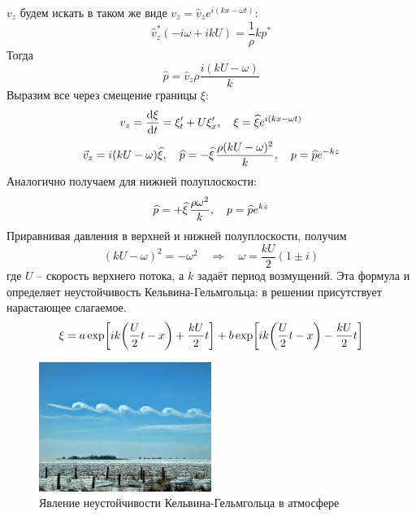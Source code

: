 $v_z$ будем искать в таком же виде $v_z=\hat{v}_z e^{i(kx-\omega t)}$:
\begin{equation}
    \hat{v}_z^* (-i\omega +ikU) = \frac{1}{\rho}k p^*
\end{equation} 
Тогда
\begin{equation}
    \hat{p} = \hat{v}_z \rho \frac{i(kU-\omega)}{k}
\end{equation}
Выразим все через смещение границы $\xi$:
\begin{equation}
    v_z = \dv{\xi}{t} = \xi'_t + U \xi'_x, \quad
    \xi = \widehat{\xi} e^{i(kx-\omega t)}
\end{equation}
\begin{equation}
    \vec{v}_z = i(kU-\omega)\hat{\xi}, \quad
    \hat{p} = -\phat{\xi} \frac{\rho(kU-\omega)^2}{k}, \quad
        p = \hat{p} e^{-kz}
\end{equation}
Аналогично получаем для нижней полуплоскости:
\begin{equation}
   \hat{p} = +\phat{\xi} \frac{\rho \omega^2}{k}, \quad
   p = \hat{p} e^{kz} 
\end{equation}
Приравнивая давления в верхней и нижней полуплоскости, получим
\begin{equation}
    (kU-\omega)^2 = -\omega^2 
    \quad\Rightarrow\quad 
    \omega = \frac{kU}{2}(1\pm i)
\end{equation}
где $U$ -- скорость верхнего потока, а $k$ задаёт период возмущений.
Эта формула и определяет неустойчивость Кельвина-Гельмгольца: в решении присутствует нарастающее слагаемое.
\begin{equation}
    \xi = a \exp[
        ik \qty(\frac{U}{2}t-x)+ \frac{kU}{2}t
    ]+b\exp[
        ik\qty(\frac{U}{2}t-x)-\frac{kU}{2}t
    ]
\end{equation}

\begin{figure}[H]
	\centering
	\includegraphics[width=0.5\textwidth]{img/xi_kelv.png}
	\caption{Явление неустойчивости Кельвина-Гельмгольца в атмосфере}
	\label{fig:xi_kelv}
\end{figure}

